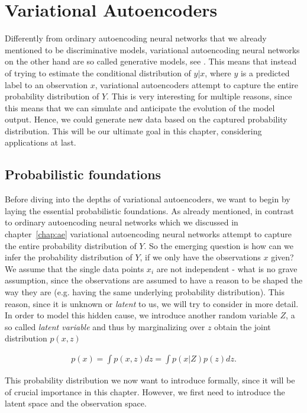 \chapter{Variational Autoencoders}\label{chap:vae}

Differently from ordinary autoencoding neural networks that we already mentioned to be discriminative models, variational autoencoding neural networks on the other hand are so called generative models, see \cite[Chapter~5]{cinelli2021variational}. This means that instead of trying to estimate the conditional distribution of $y|x$, where $y$ is a predicted label to an observation $x$, variational autoencoders attempt to capture the entire probability distribution of $Y$. This is very interesting for multiple reasons, since this means that we can simulate and anticipate the evolution of the model output. Hence, we could generate new data based on the captured probability distribution. This will be our ultimate goal in this chapter, considering applications at last.

\section{Probabilistic foundations}

Before diving into the depths of variational autoencoders, we want to begin by laying the essential probabilistic foundations. As already mentioned, in contrast to ordinary autoencoding neural networks which we discussed in chapter~\ref{chap:ae}
variational autoencoding neural networks attempt to capture the entire probability distribution of $Y$. So the emerging question is how can we infer the probability distribution of $Y$, if we only have the observations $x$ given? We assume that the single data points $x_i$ are not independent - what is no grave assumption, since the observations are assumed to have a reason to be shaped the way they are (e.g. having the same underlying probability distribution). This reason, since it is unknown or \textit{latent} to us, we will try to consider in more detail. In order to model this hidden cause, we introduce another random variable $Z$, a so called \textit{latent variable} and thus by marginalizing over $z$ obtain the joint distribution $p(x,z)$

\begin{align}\label{eq:evidence}
p(x) = \int p(x,z) dz = \int p(x|Z)p(z)dz.
\end{align}

This probability distribution we now want to introduce formally, since it will be of crucial importance in this chapter. However, we first need to introduce the latent space and the observation space.

